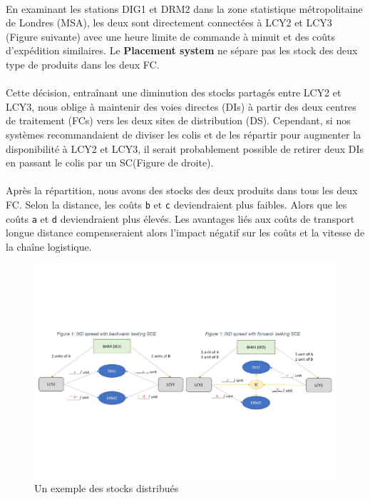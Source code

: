 \paragraph{}
\vspace{-2em}
En examinant les stations DIG1 et DRM2 dans la zone statistique métropolitaine de Londres (MSA), les deux sont directement connectées à LCY2 et LCY3 (Figure suivante) avec une heure limite de commande à minuit et des coûts d'expédition similaires. 
Le \textbf{Placement system} ne sépare pas les stock des deux type de produits dans les deux FC. 

\paragraph{}
\vspace{-2em}
Cette décision, entraînant une diminution des stocks partagés entre LCY2 et LCY3, nous oblige à maintenir des voies directes (DIs) à partir des deux centres de traitement (FCs) vers les deux sites de distribution (DS). Cependant, si nos systèmes recommandaient de diviser les colis et de les répartir pour augmenter la disponibilité à LCY2 et LCY3, il serait probablement possible de retirer deux DIs en passant le colis par un SC(Figure de droite).

\paragraph{}
\vspace{-2em}
Après la répartition, nous avons des stocks des deux produits dans tous les deux FC. Selon la distance, les coûts \texttt{b} et \texttt{c} deviendraient plus faibles. Alors que les coûts \texttt{a} et \texttt{d} deviendraient plus élevés. Les avantages liés aux coûts de transport longue distance compenseraient alors l'impact négatif sur les coûts et la vitesse de la chaîne logistique.

\begin{figure}[htbp]
    \centering
    \includegraphics[width=0.8\linewidth]{./Graphismes-UTC/logos/Amazon/mobius schema 1.pdf}\hfill
    \caption{Un exemple des stocks distribués}
\end{figure}

